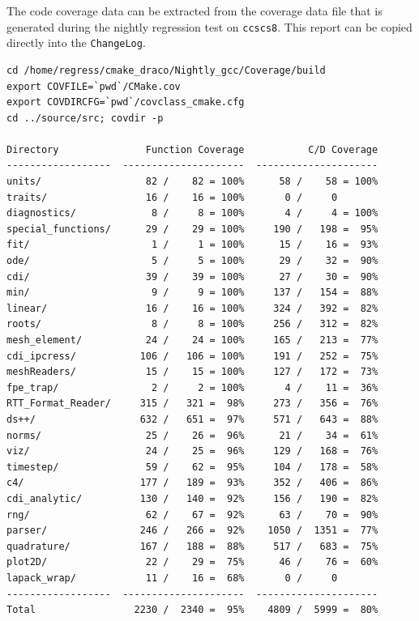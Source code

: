 \documentclass[note]{newmemo}
\begin{document}
The code coverage data can be extracted from the coverage data file
that is generated during the nightly regression test on
\texttt{ccscs8}. This report can be copied directly into the
\texttt{ChangeLog}. 
%
\begin{lstlisting}[basicstyle=\footnotesize, xleftmargin=1.0in, 
  xrightmargin=1.0in]
cd /home/regress/cmake_draco/Nightly_gcc/Coverage/build
export COVFILE=`pwd`/CMake.cov
export COVDIRCFG=`pwd`/covclass_cmake.cfg
cd ../source/src; covdir -p

Directory               Function Coverage           C/D Coverage
------------------  ---------------------  ---------------------
units/                  82 /    82 = 100%      58 /    58 = 100%
traits/                 16 /    16 = 100%       0 /     0
diagnostics/             8 /     8 = 100%       4 /     4 = 100%
special_functions/      29 /    29 = 100%     190 /   198 =  95%
fit/                     1 /     1 = 100%      15 /    16 =  93%
ode/                     5 /     5 = 100%      29 /    32 =  90%
cdi/                    39 /    39 = 100%      27 /    30 =  90%
min/                     9 /     9 = 100%     137 /   154 =  88%
linear/                 16 /    16 = 100%     324 /   392 =  82%
roots/                   8 /     8 = 100%     256 /   312 =  82%
mesh_element/           24 /    24 = 100%     165 /   213 =  77%
cdi_ipcress/           106 /   106 = 100%     191 /   252 =  75%
meshReaders/            15 /    15 = 100%     127 /   172 =  73%
fpe_trap/                2 /     2 = 100%       4 /    11 =  36%
RTT_Format_Reader/     315 /   321 =  98%     273 /   356 =  76%
ds++/                  632 /   651 =  97%     571 /   643 =  88%
norms/                  25 /    26 =  96%      21 /    34 =  61%
viz/                    24 /    25 =  96%     129 /   168 =  76%
timestep/               59 /    62 =  95%     104 /   178 =  58%
c4/                    177 /   189 =  93%     352 /   406 =  86%
cdi_analytic/          130 /   140 =  92%     156 /   190 =  82%
rng/                    62 /    67 =  92%      63 /    70 =  90%
parser/                246 /   266 =  92%    1050 /  1351 =  77%
quadrature/            167 /   188 =  88%     517 /   683 =  75%
plot2D/                 22 /    29 =  75%      46 /    76 =  60%
lapack_wrap/            11 /    16 =  68%       0 /     0
------------------  ---------------------  ---------------------
Total                 2230 /  2340 =  95%    4809 /  5999 =  80%
\end{lstlisting}

\end{document}
